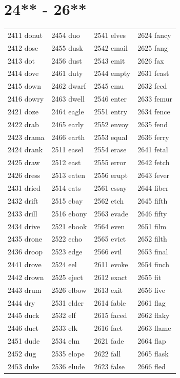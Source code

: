 \documentclass[12pt, oneside]{book}
\begin{document}
	\begin{table}[h]
		\centering
		\section*{24** - 26**}
		\begin{tabular}{l l l l}
			2411 donut & 2454 duo & 2541 elves & 2624 fancy\\
			2412 dose & 2455 dusk & 2542 email & 2625 fang\\
			2413 dot & 2456 dust & 2543 emit & 2626 fax\\
			2414 dove & 2461 duty & 2544 empty & 2631 feast\\
			2415 down & 2462 dwarf & 2545 emu & 2632 feed\\
			2416 dowry & 2463 dwell & 2546 enter & 2633 femur\\
			2421 doze & 2464 eagle & 2551 entry & 2634 fence\\
			2422 drab & 2465 early & 2552 envoy & 2635 fend\\
			2423 drama & 2466 earth & 2553 equal & 2636 ferry\\
			2424 drank & 2511 easel & 2554 erase & 2641 fetal\\
			2425 draw & 2512 east & 2555 error & 2642 fetch\\
			2426 dress & 2513 eaten & 2556 erupt & 2643 fever\\
			2431 dried & 2514 eats & 2561 essay & 2644 fiber\\
			2432 drift & 2515 ebay & 2562 etch & 2645 fifth\\
			2433 drill & 2516 ebony & 2563 evade & 2646 fifty\\
			2434 drive & 2521 ebook & 2564 even & 2651 film\\
			2435 drone & 2522 echo & 2565 evict & 2652 filth\\
			2436 droop & 2523 edge & 2566 evil & 2653 final\\
			2441 drove & 2524 eel & 2611 evoke & 2654 finch\\
			2442 drown & 2525 eject & 2612 exact & 2655 fit\\
			2443 drum & 2526 elbow & 2613 exit & 2656 five\\
			2444 dry & 2531 elder & 2614 fable & 2661 flag\\
			2445 duck & 2532 elf & 2615 faced & 2662 flaky\\
			2446 duct & 2533 elk & 2616 fact & 2663 flame\\
			2451 dude & 2534 elm & 2621 fade & 2664 flap\\
			2452 dug & 2535 elope & 2622 fall & 2665 flask\\
			2453 duke & 2536 elude & 2623 false & 2666 fled\\
		\end{tabular}
	\end{table}
	
\end{document}
